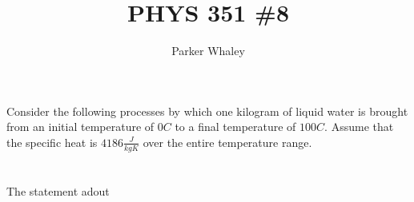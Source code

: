 \documentclass[10pt,a4paper]{article}
\author{Parker Whaley}
\title{PHYS 351 \#8}
\begin{document}
\maketitle
\section{}
Consider the following processes by which one kilogram of liquid water is brought from an initial temperature of $0C$ to a final temperature of $100C$. Assume that the specific heat is $4186 \frac{J}{kgK}$ over the entire temperature range.
\section{}
The statement adout
\end{document}

